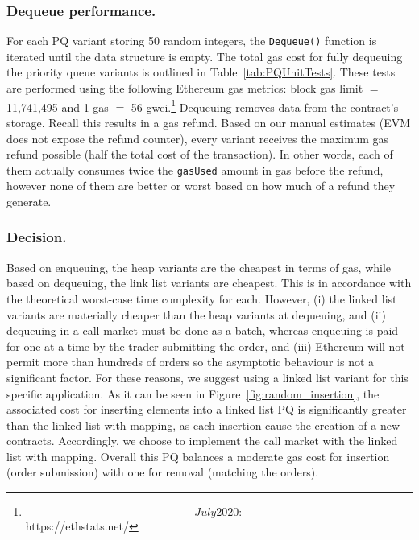 \subsubsection{Dequeue performance.} For each PQ variant storing 50 random integers, the \texttt{Dequeue()} function is iterated until the data structure is empty. The total gas cost for fully dequeuing the priority queue variants is outlined in Table~\ref{tab:PQUnitTests}. These tests are performed using the following Ethereum gas metrics: block gas limit $=$11,741,495 and 1 gas $=$ 56 gwei.\footnote{\[July 2020:\] https://ethstats.net/} Dequeuing removes data from the contract's storage. Recall this results in a gas refund. Based on our manual estimates (EVM does not expose the refund counter), every variant receives the maximum gas refund possible (\ie half the total cost of the transaction). In other words, each of them actually consumes twice the \texttt{gasUsed} amount in gas before the refund, however none of them are better or worst based on how much of a refund they generate.  

\subsubsection{Decision.} Based on enqueuing, the heap variants are the cheapest in terms of gas, while based on dequeuing, the link list variants are cheapest. This is in accordance with the theoretical worst-case time complexity for each. However, (i) the linked list variants are materially cheaper than the heap variants at dequeuing, and (ii) dequeuing in a call market must be done as a batch, whereas enqueuing is paid for one at a time by the trader submitting the order, and (iii) Ethereum will not permit more than hundreds of orders so the asymptotic behaviour is not a significant factor. For these reasons, we suggest using a linked list variant for this specific application. As it can be seen in Figure~\ref{fig:random_insertion}, the associated cost for inserting elements into a linked list PQ is significantly greater than the linked list with mapping, as each insertion cause the creation of a new contracts. Accordingly, we choose to implement the call market with the linked list with mapping. Overall this PQ balances a moderate gas cost for insertion (\ie order submission) with one for removal (\ie matching the orders). 


